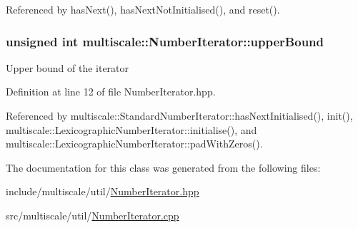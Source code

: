 Referenced by has\-Next(), has\-Next\-Not\-Initialised(), and reset().

\hypertarget{classmultiscale_1_1NumberIterator_a56a5558958778bbde64e249d67cba886}{
\subsubsection[{upper\-Bound}]{\setlength{\rightskip}{0pt plus 5cm}unsigned int multiscale\-::\-Number\-Iterator\-::upper\-Bound\hspace{0.3cm}{\ttfamily [protected]}}}\label{classmultiscale_1_1NumberIterator_a56a5558958778bbde64e249d67cba886}
Upper bound of the iterator 

Definition at line 12 of file Number\-Iterator.\-hpp.



Referenced by multiscale\-::\-Standard\-Number\-Iterator\-::has\-Next\-Initialised(), init(), multiscale\-::\-Lexicographic\-Number\-Iterator\-::initialise(), and multiscale\-::\-Lexicographic\-Number\-Iterator\-::pad\-With\-Zeros().



The documentation for this class was generated from the following files\-:\begin{DoxyCompactItemize}
\item 
include/multiscale/util/\hyperlink{NumberIterator_8hpp}{Number\-Iterator.\-hpp}\item 
src/multiscale/util/\hyperlink{NumberIterator_8cpp}{Number\-Iterator.\-cpp}\end{DoxyCompactItemize}
